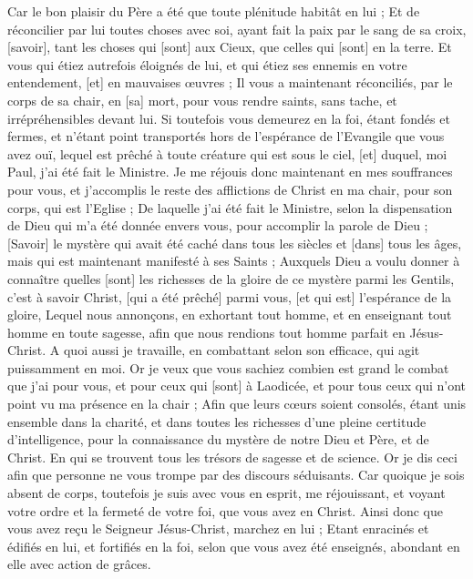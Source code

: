 \begin{multicols}{2}
Car le bon plaisir du Père a été que toute plénitude habitât en lui ;
Et de réconcilier par lui toutes choses avec soi, ayant fait la paix par le sang de sa croix, [savoir], tant les choses qui [sont] aux Cieux, que celles qui [sont] en la terre.
Et vous qui étiez autrefois éloignés de lui, et qui étiez ses ennemis en votre entendement, [et] en mauvaises œuvres ;
Il vous a maintenant réconciliés, par le corps de sa chair, en [sa] mort, pour vous rendre saints, sans tache, et irrépréhensibles devant lui.
Si toutefois vous demeurez en la foi, étant fondés et fermes, et n'étant point transportés hors de l'espérance de l'Evangile que vous avez ouï, lequel est prêché à toute créature qui est sous le ciel, [et] duquel, moi Paul, j'ai été fait le Ministre.
Je me réjouis donc maintenant en mes souffrances pour vous, et j'accomplis le reste des afflictions de Christ en ma chair, pour son corps, qui est l'Eglise ;
De laquelle j'ai été fait le Ministre, selon la dispensation de Dieu qui m'a été donnée envers vous, pour accomplir la parole de Dieu ;
[Savoir] le mystère qui avait été caché dans tous les siècles et [dans] tous les âges, mais qui est maintenant manifesté à ses Saints ;
Auxquels Dieu a voulu donner à connaître quelles [sont] les richesses de la gloire de ce mystère parmi les Gentils, c'est à savoir Christ, [qui a été prêché] parmi vous, [et qui est] l'espérance de la gloire,
Lequel nous annonçons, en exhortant tout homme, et en enseignant tout homme en toute sagesse, afin que nous rendions tout homme parfait en Jésus-Christ.
A quoi aussi je travaille, en combattant selon son efficace, qui agit puissamment en moi.
\VerseOne{}Or je veux que vous sachiez combien est grand le combat que j'ai pour vous, et pour ceux qui [sont] à Laodicée, et pour tous ceux qui n'ont point vu ma présence en la chair ;
Afin que leurs cœurs soient consolés, étant unis ensemble dans la charité, et dans toutes les richesses d'une pleine certitude d'intelligence, pour la connaissance du mystère de notre Dieu et Père, et de Christ.
En qui se trouvent tous les trésors de sagesse et de science.
Or je dis ceci afin que personne ne vous trompe par des discours séduisants.
Car quoique je sois absent de corps, toutefois je suis avec vous en esprit, me réjouissant, et voyant votre ordre et la fermeté de votre foi, que vous avez en Christ.
Ainsi donc que vous avez reçu le Seigneur Jésus-Christ, marchez en lui ;
Etant enracinés et édifiés en lui, et fortifiés en la foi, selon que vous avez été enseignés, abondant en elle avec action de grâces.

\end{multicols}
